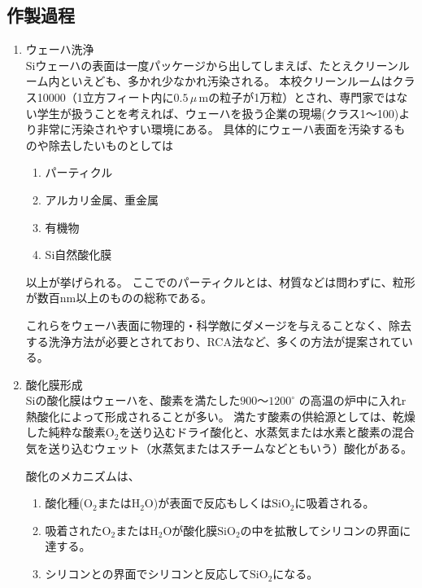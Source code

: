 \documentclass[11pt]{jarticle}
\begin{document}
	\subsection{作製過程}
		\begin{enumerate}
			\item ウェーハ洗浄\\
				Siウェーハの表面は一度パッケージから出してしまえば、たとえクリーンルーム内といえども、多かれ少なかれ汚染される。
				本校クリーンルームはクラス10000（1立方フィート内に$0.5\,\mu$\,mの粒子が1万粒）とされ、専門家ではない学生が扱うことを考えれば、ウェーハを扱う企業の現場(クラス1〜100)より非常に汚染されやすい環境にある。
				具体的にウェーハ表面を汚染するものや除去したいものとしては

				\begin{enumerate}
					\item パーティクル\\
					\item アルカリ金属、重金属\\
					\item 有機物\\
					\item Si自然酸化膜\\
				\end{enumerate}

				以上が挙げられる。
				ここでのパーティクルとは、材質などは問わずに、粒形が数百nm以上のものの総称である。

				これらをウェーハ表面に物理的・科学敵にダメージを与えることなく、除去する洗浄方法が必要とされており、RCA法など、多くの方法が提案されている。

			\item 酸化膜形成\\
				Siの酸化膜はウェーハを、酸素を満たした$900〜1200^\circ$ の高温の炉中に入れr熱酸化によって形成されることが多い。
				満たす酸素の供給源としては、乾燥した純粋な酸素$\mathrm{O_{2}}$を送り込むドライ酸化と、水蒸気または水素と酸素の混合気を送り込むウェット（水蒸気またはスチームなどともいう）酸化がある。

				酸化のメカニズムは、

				\begin{enumerate}
					\item 酸化種($\mathrm{O_{2}}$または$\mathrm{H_{2}O}$)が表面で反応もしくは$\mathrm{SiO_{2}}$に吸着される。\\
					\item 吸着された$\mathrm{O}_{2}$または$\mathrm{H_{2}O}$が酸化膜$\mathrm{SiO_{2}}$の中を拡散してシリコンの界面に達する。\\
					\item シリコンとの界面でシリコンと反応して$\mathrm{SiO_{2}}$になる。\\
				\end{enumerate}
				

\end{enumerate}
\end{document}
